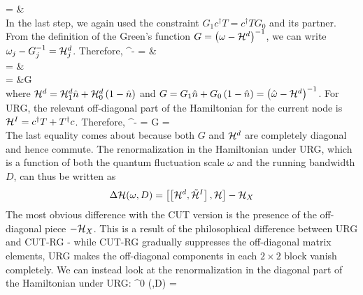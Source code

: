 \documentclass[12pt,twoside]{report}
\numberwithin{equation}{section}
\begin{document}
= &\\
\eeq
In the last step, we again used the constraint \(G_1 c^\dagger T = c^\dagger T G_0\) and its partner. From the definition of the Green's function \(G = \left({\omega - \mathcal{H}^d}\right)^{-1}\), we can write \(\omega_j - G_j^{-1} = \mathcal{H}^d_j\). Therefore,
\beq
\eta^\dagger - \eta = &\\
= &\\
= &G\\
\eeq
where \(\mathcal{H}^d = \mathcal{H}^d_1 \hat n + \mathcal{H}^d_0 \left({1 - \hat n}\right)\) and \(G = G_1 \hat n + G_0 \left({1 -\hat n}\right) = \left({\hat \omega - \mathcal{H}^d}\right)^{-1}\). For URG, the relevant off-diagonal part of the Hamiltonian for the current node is \(\mathcal{H}^I = c^\dagger T + T^\dagger c\). Therefore,
\beq
\eta^\dagger - \eta = G = \\
\eeq
The last equality comes about because both \(G\) and \(\mathcal{H}^d\) are completely diagonal and hence commute. The renormalization in the Hamiltonian under URG, which is a function of both the quantum fluctuation scale \(\omega\) and the running bandwidth \(D\), can thus be written as
\begin{equation}\begin{aligned}
	\Delta \mathcal{H} (\omega,D) =  \left[{\left[{\mathcal{H}^d,\tilde{\mathcal{H}}^I}\right],\mathcal{H}}\right] - \mathcal{H}_X\\
\end{aligned}\end{equation}
The most obvious difference with the CUT version is the presence of the off-diagonal piece \(-\mathcal{H}_X\). This is a result of the philosophical difference between URG and CUT-RG - while CUT-RG gradually suppresses the off-diagonal matrix elements, URG makes the off-diagonal components in each \(2\times 2\) block vanish completely. We can instead look at the renormalization in the diagonal part of the Hamiltonian under URG:
\beq[dbrack]
\Delta \ham^0 (\omega,D) =  \\
\end{document}
